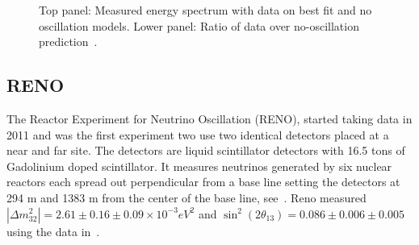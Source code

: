 \begin{figure}[h!]
\begin{minipage}[b]{0.49\textwidth}
       \vspace{2mm}
    \caption{Top panel: Measured energy spectrum with data on best fit and no oscillation models. Lower panel: Ratio of data over no-oscillation prediction~\cite{72Double}.}
     \label{fig:dc2}
  \end{minipage}
\end{figure}

\subsection{RENO}
The Reactor Experiment for Neutrino Oscillation (RENO), started taking data in 2011 and was the first experiment two use two identical detectors placed at a near and far site. The detectors are liquid scintillator detectors with 16.5 tons of Gadolinium doped scintillator. It measures neutrinos generated by six nuclear reactors each spread out perpendicular from a base line setting the detectors at 294 m and 1383 m from the center of the base line, see~. Reno measured $|\Delta m^2_{32}| = 2.61 \pm 0.16 \pm 0.09 \times 10^{-3} eV^2$ and $\sin^2(2\theta_{13}) = 0.086 \pm 0.006 \pm 0.005$ using the data in~.


